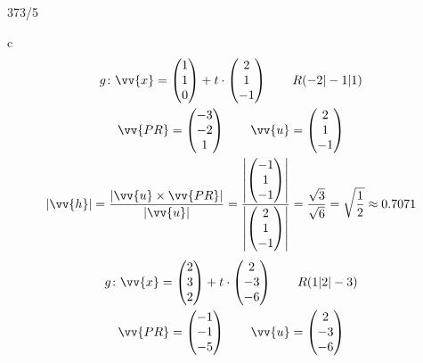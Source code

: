 \begin{exercise}{373/5}
  \item [c]
  \begin{gather*}
    g \colon \vv{x} = \begin{pmatrix}1 \\ 1 \\ 0\end{pmatrix} + t \cdot \begin{pmatrix}2 \\ 1 \\ -1\end{pmatrix} \qquad R(-2|-1|1) \\
    \vv{PR} = \begin{pmatrix}-3 \\ -2 \\ 1\end{pmatrix} \qquad \vv{u} = \begin{pmatrix}2 \\ 1 \\ -1\end{pmatrix} \\
    |\vv{h}| = \frac{|\vv{u} \times \vv{PR}|}{|\vv{u}|} = \frac{\left|\begin{pmatrix}-1 \\ 1 \\ -1\end{pmatrix}\right|}{\left|\begin{pmatrix}2 \\ 1 \\ -1\end{pmatrix}\right|} = \frac{\sqrt{3}}{\sqrt{6}} = \sqrt{\frac{1}{2}} \approx 0.7071
  \end{gather*}
  \begin{gather*}
    g \colon \vv{x} = \begin{pmatrix}2 \\ 3 \\ 2\end{pmatrix} + t \cdot \begin{pmatrix}2 \\ -3 \\ -6\end{pmatrix} \qquad R(1|2|-3) \\
    \vv{PR} = \begin{pmatrix}-1 \\ -1 \\ -5\end{pmatrix} \qquad \vv{u} = \begin{pmatrix}2 \\ -3 \\ -6\end{pmatrix} \\

\end{gather*}
\end{exercise}

